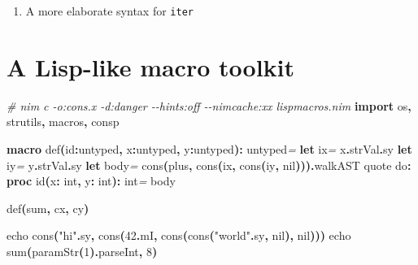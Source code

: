 \documentclass[
  12pt,
]{book}
\newenvironment{Shaded}{}{}
\newcommand{\CommentTok}[1]{\textcolor[rgb]{0.38,0.63,0.69}{\textit{#1}}}
\newcommand{\DataTypeTok}[1]{\textcolor[rgb]{0.56,0.13,0.00}{#1}}
\newcommand{\DecValTok}[1]{\textcolor[rgb]{0.25,0.63,0.44}{#1}}
\newcommand{\FloatTok}[1]{\textcolor[rgb]{0.25,0.63,0.44}{#1}}
\newcommand{\KeywordTok}[1]{\textcolor[rgb]{0.00,0.44,0.13}{\textbf{#1}}}
\newcommand{\NormalTok}[1]{#1}
\newcommand{\StringTok}[1]{\textcolor[rgb]{0.25,0.44,0.63}{#1}}
\providecommand{\tightlist}{%
  \setlength{\itemsep}{0pt}\setlength{\parskip}{0pt}}
\begin{document}
\begin{enumerate}
\def\labelenumi{(\arabic{enumi})}
\setcounter{enumi}{19}
\tightlist
\item
  A more elaborate syntax for \texttt{iter}
\end{enumerate}

\chapter{A Lisp-like macro toolkit}\label{a-lisp-like-macro-toolkit}

\label{chp:Lisp-like-macro}

\begin{Shaded}
\begin{Highlighting}[]
\CommentTok{\# nim c {-}o:cons.x {-}d:danger {-}{-}hints:off {-}{-}nimcache:xx lispmacros.nim }
\KeywordTok{import}\NormalTok{ os}\KeywordTok{,}\NormalTok{ strutils}\KeywordTok{,}\NormalTok{ macros}\KeywordTok{,}\NormalTok{ consp}

\KeywordTok{macro }\StringTok{def}\KeywordTok{(}\NormalTok{id}\KeywordTok{:}\DataTypeTok{untyped}\KeywordTok{,}\NormalTok{ x}\KeywordTok{:}\DataTypeTok{untyped}\KeywordTok{,}\NormalTok{ y}\KeywordTok{:}\DataTypeTok{untyped}\KeywordTok{):} \DataTypeTok{untyped}\CommentTok{=}
  \KeywordTok{let}\NormalTok{ ix}\CommentTok{=}\NormalTok{ x}\KeywordTok{.}\DataTypeTok{strVal}\KeywordTok{.}\DataTypeTok{sy}
  \KeywordTok{let}\NormalTok{ iy}\CommentTok{=}\NormalTok{ y}\KeywordTok{.}\DataTypeTok{strVal}\KeywordTok{.}\DataTypeTok{sy}
  \KeywordTok{let}\NormalTok{ body}\CommentTok{=} \DataTypeTok{cons}\KeywordTok{(}\NormalTok{plus}\KeywordTok{,} \DataTypeTok{cons}\KeywordTok{(}\NormalTok{ix}\KeywordTok{,} \DataTypeTok{cons}\KeywordTok{(}\NormalTok{iy}\KeywordTok{,} \FloatTok{nil}\KeywordTok{))).}\DataTypeTok{walkAST}
  \DataTypeTok{quote} \DataTypeTok{do}\KeywordTok{:}
    \KeywordTok{proc }\StringTok{\textasciigrave{}id\textasciigrave{}}\KeywordTok{(}\NormalTok{\textasciigrave{}x\textasciigrave{}}\KeywordTok{:} \DataTypeTok{int}\KeywordTok{,}\NormalTok{ \textasciigrave{}y\textasciigrave{}}\KeywordTok{:} \DataTypeTok{int}\KeywordTok{):} \DataTypeTok{int}\CommentTok{=}
\NormalTok{       \textasciigrave{}body\textasciigrave{}}

\DataTypeTok{def}\KeywordTok{(}\NormalTok{sum}\KeywordTok{,}\NormalTok{ cx}\KeywordTok{,}\NormalTok{ cy}\KeywordTok{)}

\DataTypeTok{echo} \DataTypeTok{cons}\KeywordTok{(}\StringTok{"hi"}\KeywordTok{.}\DataTypeTok{sy}\KeywordTok{,} \DataTypeTok{cons}\KeywordTok{(}\DecValTok{42}\KeywordTok{.}\DataTypeTok{mI}\KeywordTok{,} \DataTypeTok{cons}\KeywordTok{(}\DataTypeTok{cons}\KeywordTok{(}\StringTok{"world"}\KeywordTok{.}\DataTypeTok{sy}\KeywordTok{,} \FloatTok{nil}\KeywordTok{),} \FloatTok{nil}\KeywordTok{)))}
\DataTypeTok{echo} \DataTypeTok{sum}\KeywordTok{(}\DataTypeTok{paramStr}\KeywordTok{(}\DecValTok{1}\KeywordTok{).}\DataTypeTok{parseInt}\KeywordTok{,} \DecValTok{8}\KeywordTok{)}
 
\end{Highlighting}
\end{Shaded}
\end{document}
